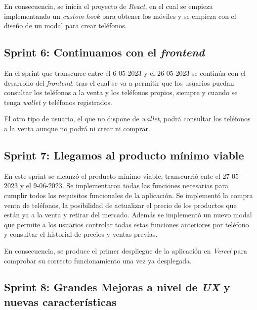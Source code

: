 En consecuencia, se inicia el proyecto de \textit{React}, en el cual se empieza implementando un \textit{custom hook} para obtener los móviles y se empieza con el diseño de un modal para crear teléfonos.

\subsection{Sprint 6: Continuamos con el \textit{frontend}}



En el sprint que transcurre entre el 6-05-2023 y el 26-05-2023 se continúa con el desarrollo del \textit{frontend},  tras el cual se va a permitir que los usuarios puedan consultar los teléfonos a la venta y los teléfonos propios, siempre y cuando se tenga \textit{wallet} y teléfonos registrados.


El otro tipo de usuario, el que no dispone de \textit{wallet}, podrá consultar los teléfonos a la venta aunque no podrá ni crear ni comprar.

\subsection{Sprint 7: Llegamos al producto mínimo viable}



En este sprint se alcanzó el producto mínimo viable, transcurrió ente el 27-05-2023 y el 9-06-2023. Se implementaron todas las funciones necesarias para cumplir todos los requisitos funcionales de la aplicación. 
Se implementó la compra venta de teléfonos, la posibilidad de actualizar el precio de los productos que están ya a la venta y retirar del mercado. Además se implementó un nuevo modal que permite a los usuarios controlar todas estas funciones anteriores por teléfono y consultar el historial de precios y ventas previas.


En consecuencia, se produce el primer despliegue de la aplicación en \textit{Vercel} para comprobar su correcto funcionamiento una vez ya desplegada.

\subsection{Sprint 8: Grandes Mejoras a nivel de \textit{UX} y nuevas características}

